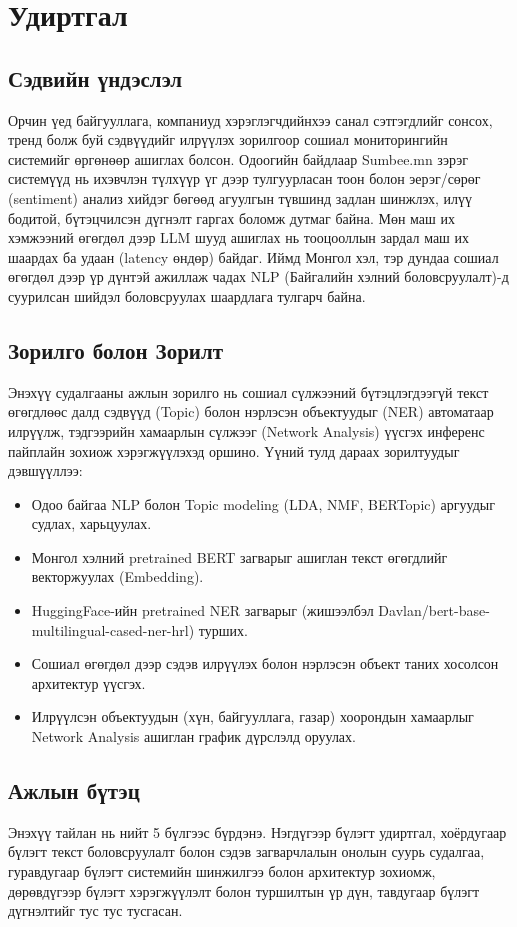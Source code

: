 \chapter{Удиртгал}

\section{Сэдвийн үндэслэл}
Орчин үед байгууллага, компаниуд хэрэглэгчдийнхээ санал сэтгэгдлийг сонсох, тренд болж буй сэдвүүдийг илрүүлэх зорилгоор сошиал мониторингийн системийг өргөнөөр ашиглах болсон. Одоогийн байдлаар Sumbee.mn зэрэг системүүд нь ихэвчлэн түлхүүр үг дээр тулгуурласан тоон болон эерэг/сөрөг (sentiment) анализ хийдэг бөгөөд агуулгын түвшинд задлан шинжлэх, илүү бодитой, бүтэцчилсэн дүгнэлт гаргах боломж дутмаг байна. Мөн маш их хэмжээний өгөгдөл дээр LLM шууд ашиглах нь тооцооллын зардал маш их шаардах ба удаан (latency өндөр) байдаг. Иймд Монгол хэл, тэр дундаа сошиал өгөгдөл дээр үр дүнтэй ажиллаж чадах NLP (Байгалийн хэлний боловсруулалт)-д суурилсан шийдэл боловсруулах шаардлага тулгарч байна.

\section{Зорилго болон Зорилт}
Энэхүү судалгааны ажлын зорилго нь сошиал сүлжээний бүтэцлэгдээгүй текст өгөгдлөөс далд сэдвүүд (Topic) болон нэрлэсэн объектуудыг (NER) автоматаар илрүүлж, тэдгээрийн хамаарлын сүлжээг (Network Analysis) үүсгэх инференс пайплайн зохиож хэрэгжүүлэхэд оршино. Үүний тулд дараах зорилтуудыг дэвшүүллээ:
\begin{itemize}
    \item Одоо байгаа NLP болон Topic modeling (LDA, NMF, BERTopic) аргуудыг судлах, харьцуулах.
    \item Монгол хэлний pretrained BERT загварыг ашиглан текст өгөгдлийг векторжуулах (Embedding).
    \item HuggingFace-ийн pretrained NER загварыг (жишээлбэл Davlan/bert-base-multilingual-cased-ner-hrl) турших.
    \item Сошиал өгөгдөл дээр сэдэв илрүүлэх болон нэрлэсэн объект таних хосолсон архитектур үүсгэх.
    \item Илрүүлсэн объектуудын (хүн, байгууллага, газар) хоорондын хамаарлыг Network Analysis ашиглан график дүрслэлд оруулах.
\end{itemize}

\section{Ажлын бүтэц}
Энэхүү тайлан нь нийт 5 бүлгээс бүрдэнэ. Нэгдүгээр бүлэгт удиртгал, хоёрдугаар бүлэгт текст боловсруулалт болон сэдэв загварчлалын онолын суурь судалгаа, гуравдугаар бүлэгт системийн шинжилгээ болон архитектур зохиомж, дөрөвдүгээр бүлэгт хэрэгжүүлэлт болон туршилтын үр дүн, тавдугаар бүлэгт дүгнэлтийг тус тус тусгасан.
